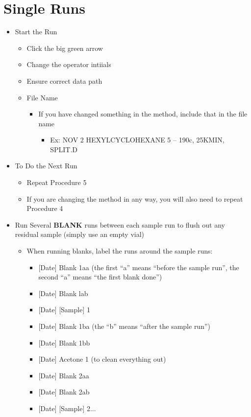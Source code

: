 \documentclass[letterpaper,11pt]{article}
\begin{document}
\section{Single Runs}
	\begin{itemize}
	\item Start the Run
    	\begin{itemize}
    	\item Click the big green arrow
        \item Change the operator intiials
        \item Ensure correct data path
        \item File Name
        	\begin{itemize}
        	\item If you have changed something in the method, include that in the file name
            	\begin{itemize}
            	\item Ex: NOV 2 HEXYLCYCLOHEXANE 5 	-- 190c, 25KMIN, SPLIT.D
            	\end{itemize}
        	\end{itemize}
    	\end{itemize}
        \item To Do the Next Run
        	\begin{itemize}
        	\item Repeat Procedure 5
            \item If you are changing the method in any way, you will also need to repeat Procedure 4
        	\end{itemize}
        \item Run Several \textbf{BLANK} runs between each sample run to flush out any residual sample (simply use an empty vial)
        	\begin{itemize}
        	\item When running blanks, label the runs around the sample runs:
            	\begin{itemize}
            	\item{} [Date] Blank 1aa (the first ``a'' means ``before the sample run'', the second ``a'' means ``the first blank done'')
                \item{} [Date] Blank lab
                \item{} [Date] [Sample] 1
                \item{} [Date] Blank 1ba (the ``b'' means ``after the sample run'')
                \item{} [Date] Blank 1bb
                \item{} [Date] Acetone 1 (to clean everything out)
                \item{} [Date] Blank 2aa
                \item{} [Date] Blank 2ab
                \item{} [Date] [Sample] 2...
            	\end{itemize}
        	\end{itemize}
	\end{itemize}
\end{document}

